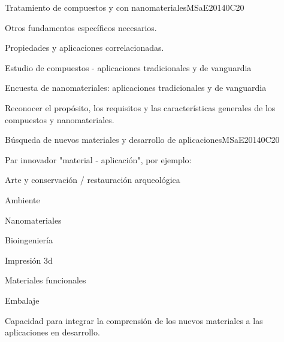 \begin{syllabus}
\begin{unit}{Tratamiento de compuestos y con nanomateriales}{}{MSaE2014}{0}{C20}
\begin{topics}
      \item Otros fundamentos específicos necesarios.
      \item Propiedades y aplicaciones correlacionadas.
      \item Estudio de compuestos - aplicaciones tradicionales y de vanguardia
      \item Encuesta de nanomateriales: aplicaciones tradicionales y de vanguardia
\end{topics}
   \begin{learningoutcomes}
      \item Reconocer el propósito, los requisitos y las características generales de los compuestos y nanomateriales.
   \end{learningoutcomes}
\end{unit}

\begin{unit}{Búsqueda de nuevos materiales y desarrollo de aplicaciones}{}{MSaE2014}{0}{C20}
\begin{topics}
      \item Par innovador  "material - aplicación", por ejemplo:
	  \begin{subtopics}
	    \item  Arte y conservación / restauración arqueológica
	    \item  Ambiente
	    \item  Nanomateriales
	    \item  Bioingeniería
	    \item  Impresión 3d
	    \item  Materiales funcionales
	    \item  Embalaje
	  \end{subtopics}  
\end{topics}
   \begin{learningoutcomes}
      \item Capacidad para integrar la comprensión de los nuevos materiales a las aplicaciones en desarrollo.
   \end{learningoutcomes}
\end{unit}












\begin{coursebibliography}
\end{coursebibliography}
\end{syllabus}
